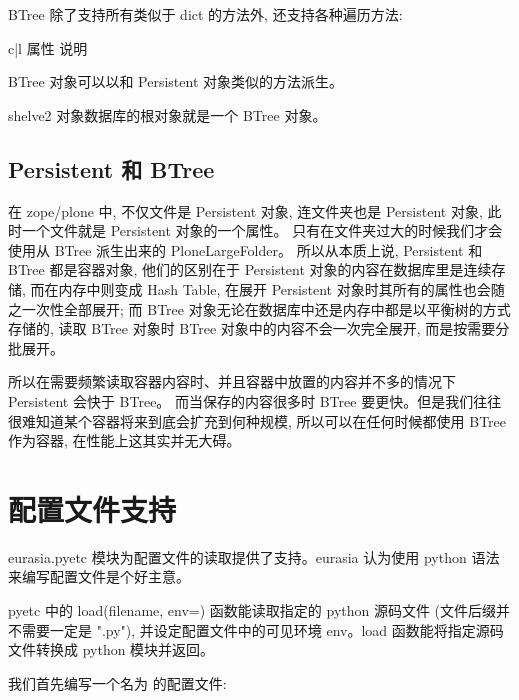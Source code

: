 \documentclass{manual}
\begin{document}
BTree 除了支持所有类似于 dict 的方法外, 还支持各种遍历方法:

\begin{tableii}{c|l}{}{ 属性 }{ 说明 }
\end{tableii}

BTree 对象可以以和 Persistent 对象类似的方法派生。

shelve2 对象数据库的根对象就是一个 BTree 对象。 

\subsection{Persistent 和 BTree}

在 zope/plone 中, 不仅文件是 Persistent 对象, 连文件夹也是 Persistent 对象,
此时一个文件就是 Persistent 对象的一个属性。
只有在文件夹过大的时候我们才会使用从 BTree 派生出来的 PloneLargeFolder。
所以从本质上说, Persistent 和 BTree 都是容器对象,
他们的区别在于 Persistent 对象的内容在数据库里是连续存储,
而在内存中则变成 Hash Table, 在展开 Persistent 对象时其所有的属性也会随之一次性全部展开;
而 BTree 对象无论在数据库中还是内存中都是以平衡树的方式存储的,
读取 BTree 对象时 BTree 对象中的内容不会一次完全展开, 而是按需要分批展开。

所以在需要频繁读取容器内容时、并且容器中放置的内容并不多的情况下 Persistent 会快于 BTree。
而当保存的内容很多时 BTree 要更快。但是我们往往很难知道某个容器将来到底会扩充到何种规模,
所以可以在任何时候都使用 BTree 作为容器, 在性能上这其实并无大碍。

\section{配置文件支持}

eurasia.pyetc 模块为配置文件的读取提供了支持。eurasia 认为使用 python 语法来编写配置文件是个好主意。

pyetc 中的 load(filename, env={}) 函数能读取指定的 python 源码文件 (文件后缀并不需要一定是 ".py"), 并设定配置文件中的可见环境 env。load 函数能将指定源码文件转换成 python 模块并返回。

我们首先编写一个名为  的配置文件:
\end{document}
